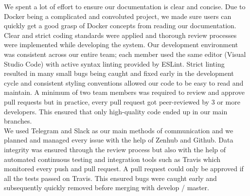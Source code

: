 \documentclass[]{article}
\newcommand{\docker}{Docker }
\begin{document}
We spent a lot of effort to ensure our documentation is clear and concise. Due to \docker being a complicated and convoluted project, we made sure users can quickly get a good grasp of \docker concepts from reading our documentation. Clear and strict coding standards were applied and thorough review processes were implemented while developing the system. Our development environment was consistent across our entire team; each member used the same editor (Visual Studio Code) with active syntax linting provided by ESLint. Strict linting resulted in many small bugs being caught and fixed early in the development cycle and consistent styling conventions allowed our code to be easy to read and maintain. A minimum of two team members was required to review and approve pull requests but in practice, every pull request got peer-reviewed by 3 or more developers. This ensured that only high-quality code ended up in our main branches. \\

We used Telegram and Slack as our main methods of communication and we planned and
managed every issue with the help of Zenhub and Github. Data integrity was ensured through the review process but also with the help of automated continuous testing and integration tools such as  Travis which monitored every push and pull request. A pull request could only be approved if all the tests passed on Travis. This ensured bugs were caught early and subsequently quickly removed before merging with develop / master.
\end{document}
